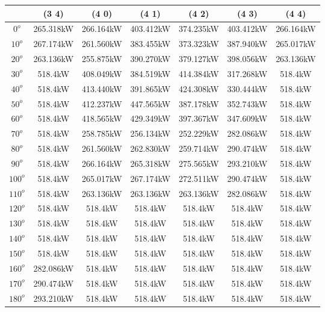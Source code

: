         \begin{table}[H]
        	\centering
        	\begin{tabular}{|c|c|c|c|c|c|c|} \hline
        			& (3 4)		& (4 0)		& (4 1)		& (4 2)		& (4 3)		& (4 4)		\\ \hline
		$0^o$	& 265.318kW	& 266.164kW	& 403.412kW	& 374.235kW	& 403.412kW	& 266.164kW	\\ \hline
		$10^o$	& 267.174kW	& 261.560kW	& 383.455kW	& 373.323kW	& 387.940kW	& 265.017kW	\\ \hline
		$20^o$	& 263.136kW	& 255.875kW	& 390.270kW	& 379.127kW	& 398.056kW	& 263.136kW	\\ \hline
		$30^o$	& 518.4kW	& 408.049kW	& 384.519kW	& 414.384kW	& 317.268kW	& 518.4kW	\\ \hline
		$40^o$	& 518.4kW	& 413.440kW	& 391.865kW	& 424.308kW	& 330.444kW	& 518.4kW	\\ \hline
		$50^o$	& 518.4kW	& 412.237kW	& 447.565kW	& 387.178kW	& 352.743kW	& 518.4kW	\\ \hline
		$60^o$	& 518.4kW	& 418.565kW	& 429.349kW	& 397.367kW	& 347.609kW	& 518.4kW	\\ \hline
		$70^o$	& 518.4kW	& 258.785kW	& 256.134kW	& 252.229kW	& 282.086kW	& 518.4kW	\\ \hline
		$80^o$	& 518.4kW	& 261.560kW	& 262.830kW	& 259.714kW	& 290.474kW	& 518.4kW	\\ \hline
		$90^o$	& 518.4kW	& 266.164kW	& 265.318kW	& 275.565kW	& 293.210kW	& 518.4kW	\\ \hline
		$100^o$	& 518.4kW	& 265.017kW	& 267.174kW	& 272.511kW	& 290.474kW	& 518.4kW	\\ \hline
		$110^o$	& 518.4kW	& 263.136kW	& 263.136kW	& 263.136kW	& 282.086kW	& 518.4kW	\\ \hline
		$120^o$	& 518.4kW	& 518.4kW	& 518.4kW	& 518.4kW	& 518.4kW	& 518.4kW	\\ \hline
		$130^o$	& 518.4kW	& 518.4kW	& 518.4kW	& 518.4kW	& 518.4kW	& 518.4kW	\\ \hline
		$140^o$	& 518.4kW	& 518.4kW	& 518.4kW	& 518.4kW	& 518.4kW	& 518.4kW	\\ \hline
		$150^o$	& 518.4kW	& 518.4kW	& 518.4kW	& 518.4kW	& 518.4kW	& 518.4kW	\\ \hline
		$160^o$	& 282.086kW	& 518.4kW	& 518.4kW	& 518.4kW	& 518.4kW	& 518.4kW	\\ \hline
		$170^o$	& 290.474kW	& 518.4kW	& 518.4kW	& 518.4kW	& 518.4kW	& 518.4kW	\\ \hline
		$180^o$	& 293.210kW	& 518.4kW	& 518.4kW	& 518.4kW	& 518.4kW	& 518.4kW	\\ \hline

\end{tabular}
\end{table}
